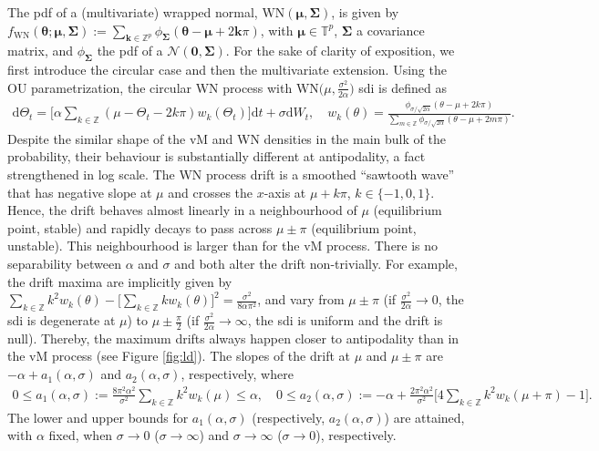 \documentclass[oneside,11pt]{article}
\newcommand{\T}{\mathbb{T}}
\newcommand{\Z}{\mathbb{Z}}
\newcommand{\rd}{\mathrm{d}}
\newcommand{\bmu}{\boldsymbol\mu}
\newcommand{\bk}{\mathbf{k}}
\newcommand{\zero}{\mathbf{0}}
\newcommand{\btheta}{\boldsymbol\theta}
\newcommand{\bSigma}{\boldsymbol\Sigma}
\newcommand{\lrp}[1]{\left(#1\right)}
\begin{document}
The pdf of a (multivariate) wrapped normal, $\mathrm{WN}\lrp{\bmu,\bSigma}$, is given by $f_{\mathrm{WN}}(\btheta;\bmu,\bSigma):=\sum_{\bk\in\Z^p}\phi_{\bSigma}(\btheta-\bmu+2\bk\pi)$, with $\bmu\in\T^p$, $\bSigma$ a covariance matrix, and $\phi_{\bSigma}$ the pdf of a $\mathcal{N}(\zero,\bSigma)$. For the sake of clarity of exposition, we first introduce the circular case and then the multivariate extension. Using the OU parametrization, the circular WN process with $\mathrm{WN}\big(\mu,\frac{\sigma^2}{2\alpha}\big)$ sdi is defined as
\begin{align}
\rd \Theta_t=\bigg[\alpha\sum_{k\in\Z}(\mu-\Theta_t-2k\pi)w_k(\Theta_t)\bigg]\rd t+\sigma\rd W_t,\quad w_k(\theta)=\frac{ \phi_{\sigma/\sqrt{2\alpha}}\lrp{\theta-\mu+2k\pi}}{\sum_{m\in\Z} \phi_{\sigma/\sqrt{2\alpha}}\lrp{\theta-\mu+2m\pi}}.\label{eq:wn1}
\end{align}
Despite the similar shape of the vM and WN densities in the main bulk of the probability, their behaviour is substantially different at antipodality, a fact strengthened in log scale. The WN process drift is a smoothed ``sawtooth wave'' that has negative slope at $\mu$ and crosses the $x$-axis at $\mu+k\pi$, $k\in\{-1,0,1\}$. Hence, the drift behaves almost linearly in a neighbourhood of $\mu$ (equilibrium point, stable) and rapidly decays to pass across $\mu\pm\pi$ (equilibrium point, unstable). This neighbourhood is larger than for the vM process. There is no separability between $\alpha$ and $\sigma$ and both alter the drift non-trivially. For example, the drift maxima are implicitly given by
$\sum_{k\in\Z}k^2w_k(\theta)-\big[\sum_{k\in\Z}kw_k(\theta)\big]^2=\frac{\sigma^2}{8\alpha\pi^2}$,
and vary from $\mu\pm\pi$ (if $\frac{\sigma^2}{2\alpha}\to0$, the sdi is degenerate at $\mu$) to $\mu\pm\frac{\pi}{2}$ (if $\frac{\sigma^2}{2\alpha}\to\infty$, the sdi is uniform and the drift is null). Thereby, the maximum drifts always happen closer to antipodality than in the vM process (see Figure \ref{fig:ld}).
The slopes of the drift at $\mu$ and $\mu\pm\pi$ are $-\alpha+a_1(\alpha,\sigma)$ and $a_2(\alpha,\sigma)$, respectively, where
\begin{align*}
0\leq a_1(\alpha,\sigma):=\frac{8\pi^2\alpha^2}{\sigma^2}\sum_{k\in\Z}k^2w_k(\mu)\leq\alpha,\quad 0\leq a_2(\alpha,\sigma):=-\alpha+\frac{2\pi^2\alpha^2}{\sigma^2}\bigg[4\sum_{k\in\Z}k^2w_{k}(\mu+\pi)-1\bigg].
\end{align*}
The lower and upper bounds for $a_1(\alpha,\sigma)$ (respectively, $a_2(\alpha,\sigma)$) are attained, with $\alpha$ fixed, when $\sigma\to0$ ($\sigma\to\infty$) and $\sigma\to\infty$ ($\sigma\to0$), respectively. \\
\end{document}
